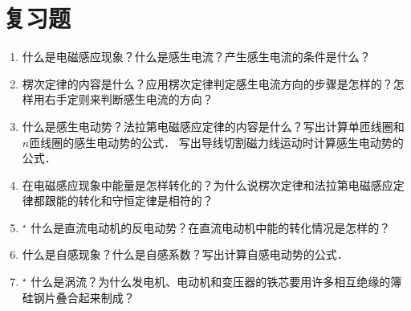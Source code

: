\section*{复习题}
\begin{enumerate}
    \item 什么是电磁感应现象？什么是感生电流？产生感生电流的条件是什么？
    \item 楞次定律的内容是什么？应用楞次定律判定感生电流方向的步骤是怎样的？怎样用右手定则来判断感生电流的方向？
    \item 什么是感生电动势？法拉第电磁感应定律的内容是什么？写出计算单匝线圈和$n$匝线圈的感生电动势的公式．
    写出导线切割磁力线运动时计算感生电动势的公式．
    \item 在电磁感应现象中能量是怎样转化的？为什么说楞次定律和法拉第电磁感应定律都跟能的转化和守恒定律是相符的？
    \item$^\star$ 什么是直流电动机的反电动势？在直流电动机中能的转化情况是怎样的？
    \item 什么是自感现象？什么是自感系数？写出计算自感电动势的公式．
    \item$^\star$ 什么是涡流？为什么发电机、电动机和变压器的铁芯要用许多相互绝缘的簿硅钢片叠合起来制成？
\end{enumerate}

